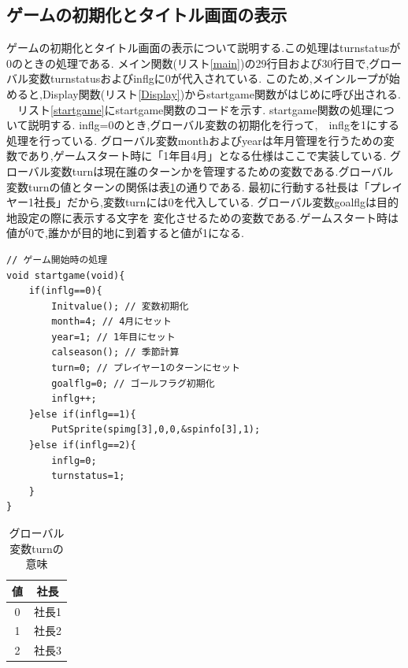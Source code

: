 \documentclass[a4j]{jarticle}
\begin{document}
    \subsection{ゲームの初期化とタイトル画面の表示}
    ゲームの初期化とタイトル画面の表示について説明する.この処理はturnstatusが0のときの処理である.
    メイン関数(リスト\ref{main})の29行目および30行目で,グローバル変数turnstatusおよびinflgに0が代入されている.
    このため,メインループが始めると,Display関数(リスト\ref{Display})からstartgame関数がはじめに呼び出される.\\
    　リスト\ref{startgame}にstartgame関数のコードを示す. startgame関数の処理について説明する.
    inflg=0のとき,グローバル変数の初期化を行って,　inflgを1にする処理を行っている.
    グローバル変数monthおよびyearは年月管理を行うための変数であり,ゲームスタート時に「1年目4月」となる仕様はここで実装している.
    グローバル変数turnは現在誰のターンかを管理するための変数である.グローバル変数turnの値とターンの関係は表\ref{whoturn}の通りである.
    最初に行動する社長は「プレイヤー1社長」だから,変数turnには0を代入している. グローバル変数goalflgは目的地設定の際に表示する文字を
    変化させるための変数である.ゲームスタート時は値が0で,誰かが目的地に到着すると値が1になる.\\
    \begin{lstlisting}[basicstyle=\ttfamily\footnotesize, frame=single,label=startgame,caption=ゲームスタート時の処理]
// ゲーム開始時の処理
void startgame(void){
    if(inflg==0){
        Initvalue(); // 変数初期化
        month=4; // 4月にセット
        year=1; // 1年目にセット
        calseason(); // 季節計算
        turn=0; // プレイヤー1のターンにセット
        goalflg=0; // ゴールフラグ初期化
        inflg++;
    }else if(inflg==1){
        PutSprite(spimg[3],0,0,&spinfo[3],1);
    }else if(inflg==2){
        inflg=0;
        turnstatus=1;
    }
}
    \end{lstlisting} 

    \begin{table}[H]
        \caption{グローバル変数turnの意味}
      \label{whoturn}
      \begin{center}
          \begin{tabular}{c|c}\hline
           値 & 社長 \\ \hline \hline
            0 & 社長1 \\
            1 & 社長2 \\
            2 & 社長3 \\ \hline
          \end{tabular}
      \end{center}
      \end{table}
\end{document}
